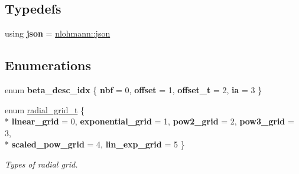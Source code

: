 \subsection*{Typedefs}
\begin{DoxyCompactItemize}
\item 
\hypertarget{namespacesirius_a9966c0f1ac6f6aa96f603fc515b8354e}{}using {\bfseries json} = \hyperlink{namespacenlohmann_a2bfd99e845a2e5cd90aeaf1b1431f474}{nlohmann\+::json}\label{namespacesirius_a9966c0f1ac6f6aa96f603fc515b8354e}

\end{DoxyCompactItemize}
\subsection*{Enumerations}
\begin{DoxyCompactItemize}
\item 
\hypertarget{namespacesirius_aa85831f0ebd13ecc4d27b17ec224c3ba}{}enum {\bfseries beta\+\_\+desc\+\_\+idx} \{ {\bfseries nbf} = 0, 
{\bfseries offset} = 1, 
{\bfseries offset\+\_\+t} = 2, 
{\bfseries ia} = 3
 \}\label{namespacesirius_aa85831f0ebd13ecc4d27b17ec224c3ba}

\item 
enum \hyperlink{namespacesirius_a9c2875496b6736959baaf053c21dafb0}{radial\+\_\+grid\+\_\+t} \{ \\*
{\bfseries linear\+\_\+grid} = 0, 
{\bfseries exponential\+\_\+grid} = 1, 
{\bfseries pow2\+\_\+grid} = 2, 
{\bfseries pow3\+\_\+grid} = 3, 
\\*
{\bfseries scaled\+\_\+pow\+\_\+grid} = 4, 
{\bfseries lin\+\_\+exp\+\_\+grid} = 5
 \}\begin{DoxyCompactList}\small\item\em Types of radial grid. \end{DoxyCompactList}
\end{DoxyCompactItemize}
